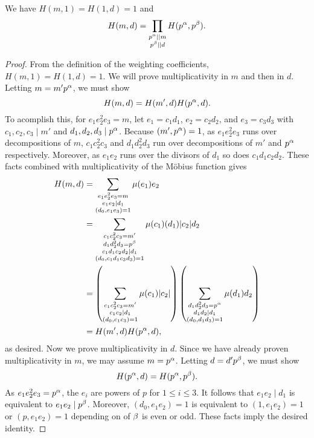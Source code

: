 \documentclass[12pt,reqno,oneside]{amsart}
\begin{document}
    \begin{proposition}\label{prop:multiplicativity_of_weighting_coefficients}
        We have $H(m,1) = H(1,d) = 1$ and
        \[
            H(m,d) = \prod_{\substack{p^{\alpha} \mid\mid m \\ p^{\beta} \mid\mid d}}H(p^{\alpha},p^{\beta}).
        \]
    \end{proposition}
    \begin{proof}
        From the definition of the weighting coefficients, $H(m,1) = H(1,d) = 1$. We will prove multiplicativity in $m$ and then in $d$. Letting $m = m'p^{\alpha}$, we must show
        \[
            H(m,d) = H(m',d)H(p^{\alpha},d).
        \]
        To acomplish this, for $e_{1}e_{2}^{2}e_{3} = m$, let $e_{1} = c_{1}d_{1}$, $e_{2} = c_{2}d_{2}$, and $e_{3} = c_{3}d_{3}$ with $c_{1},c_{2},c_{3} \mid m'$ and $d_{1},d_{2},d_{3} \mid p^{\alpha}$. Because $(m',p^{\alpha}) = 1$, as $e_{1}e_{2}^{2}e_{3}$ runs over decompositions of $m$, $c_{1}c_{2}^{2}c_{3}$ and $d_{1}d_{2}^{2}d_{3}$ run over decompositions of $m'$ and $p^{\alpha}$ respectively. Moreover, as $e_{1}e_{2}$ runs over the divisors of $d_{1}$ so does $c_{1}d_{1}c_{2}d_{2}$. These facts combined with multiplicativity of the M\"obius function gives
        \begin{align*}
            H(m,d) &= \sum_{\substack{e_{1}e_{2}^{2}e_{3} = m \\ e_{1}e_{2} \mid d_{1} \\ (d_{0},e_{1}e_{3}) = 1}}\mu(e_{1})e_{2} \\
            &= \sum_{\substack{c_{1}c_{2}^{2}c_{3} = m' \\ d_{1}d_{2}^{2}d_{3} = p^{\beta} \\ c_{1}d_{1}c_{2}d_{2} \mid d_{1} \\ (d_{0},c_{1}d_{1}c_{3}d_{3}) = 1}}\mu(c_{1})(d_{1})|c_{2}|d_{2} \\
            &= \left(\sum_{\substack{c_{1}c_{2}^{2}c_{3} = m' \\ c_{1}c_{2} \mid d_{1} \\ (d_{0},c_{1}c_{3}) = 1}}\mu(c_{1})|c_{2}|\right)\left(\sum_{\substack{d_{1}d_{2}^{2}d_{3} = p^{\alpha} \\ d_{1}d_{2} \mid d_{1} \\ (d_{0},d_{1}d_{3}) = 1}}\mu(d_{1})d_{2}\right) \\
            &= H(m',d)H(p^{\alpha},d),
        \end{align*}
        as desired. Now we prove multiplicativity in $d$. Since we have already proven multiplicativity in $m$, we may assume $m = p^{\alpha}$. Letting $d = d'p^{\beta}$, we must show
        \[
            H(p^{\alpha},d) = H(p^{\alpha},p^{\beta}).
        \]
        As $e_{1}e_{2}^{2}e_{3} = p^{\alpha}$, the $e_{i}$ are powers of $p$ for $1 \le i \le 3$. It follows that $e_{1}e_{2} \mid d_{1}$ is equivalent to $e_{1}e_{2} \mid p^{\beta}$. Moreover, $(d_{0},e_{1}e_{2}) = 1$ is equivalent to $(1,e_{1}e_{2}) = 1$ or $(p,e_{1}e_{2}) = 1$ depending on of $\beta$ is even or odd. These facts imply the desired identity.
    \end{proof}
\end{document}
